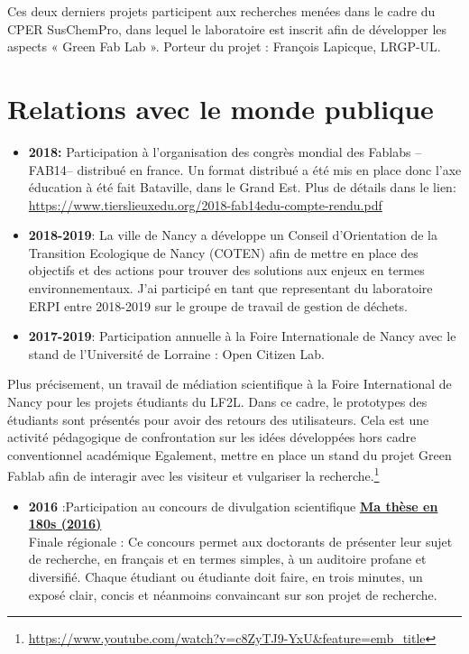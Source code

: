 \documentclass[
  12pt,
  oneside]{book}
\providecommand{\tightlist}{%
  \setlength{\itemsep}{0pt}\setlength{\parskip}{0pt}}
\begin{document}
Ces deux derniers projets participent aux recherches menées dans le cadre du CPER SusChemPro, dans lequel le laboratoire est inscrit afin de développer les aspects « Green Fab Lab ». Porteur du projet : François Lapicque, LRGP-UL.

\hypertarget{relations-avec-le-monde-publique}{%
\section{Relations avec le monde publique}\label{relations-avec-le-monde-publique}}

\begin{itemize}
\item
  \textbf{2018:} Participation à l'organisation des congrès mondial des Fablabs --FAB14-- distribué en france. Un format distribué a été mis en place donc l'axe éducation à été fait Bataville, dans le Grand Est.
  Plus de détails dans le lien: \url{https://www.tierslieuxedu.org/2018-fab14edu-compte-rendu.pdf}
\item
  \textbf{2018-2019}: La ville de Nancy a développe un Conseil d'Orientation de la Transition Ecologique de Nancy (COTEN) afin de mettre en place des objectifs et des actions pour trouver des solutions aux enjeux en termes environnementaux.
  J'ai participé en tant que representant du laboratoire ERPI entre 2018-2019 sur le groupe de travail de gestion de déchets.
\item
  \textbf{2017-2019}: Participation annuelle à la Foire Internationale de Nancy avec le stand de l'Université de Lorraine : Open Citizen Lab.
\end{itemize}

Plus précisement, un travail de médiation scientifique à la Foire International de Nancy pour les projets étudiants du LF2L. Dans ce cadre, le prototypes des étudiants sont présentés pour avoir des retours des utilisateurs. Cela est une activité pédagogique de confrontation sur les idées développées hors cadre conventionnel académique
Egalement, mettre en place un stand du projet Green Fablab afin de interagir avec les visiteur et vulgariser la recherche.\footnote{\url{https://www.youtube.com/watch?v=c8ZyTJ9-YxU&feature=emb_title}}

\begin{itemize}
\tightlist
\item
  \textbf{2016} :Participation au concours de divulgation scientifique \href{http://videos.univ-lorraine.fr/index.php?act=view&id=3475}{\textbf{Ma thèse en 180s (2016)}}\\
  Finale régionale : Ce concours permet aux doctorants de présenter leur sujet de recherche, en français et en termes simples, à un auditoire profane et diversifié. Chaque étudiant ou étudiante doit faire, en trois minutes, un exposé clair, concis et néanmoins convaincant sur son projet de recherche.
\end{itemize}
\end{document}
